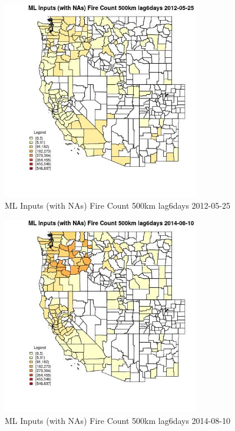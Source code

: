 \begin{figure} 
\centering  
\includegraphics[width=0.77\textwidth]{Code_Outputs/Report_ML_input_PM25_Step4_part_e_de_duplicated_aves_compiled_2019-05-18wNAs_CountyFire_Count_500km_lag6daysMean2012-05-25.jpg} 
\caption{\label{fig:Report_ML_input_PM25_Step4_part_e_de_duplicated_aves_compiled_2019-05-18wNAsCountyFire_Count_500km_lag6daysMean2012-05-25}ML Inputs (with NAs) Fire Count 500km lag6days 2012-05-25} 
\end{figure} 
 

\begin{figure} 
\centering  
\includegraphics[width=0.77\textwidth]{Code_Outputs/Report_ML_input_PM25_Step4_part_e_de_duplicated_aves_compiled_2019-05-18wNAs_CountyFire_Count_500km_lag6daysMean2014-08-10.jpg} 
\caption{\label{fig:Report_ML_input_PM25_Step4_part_e_de_duplicated_aves_compiled_2019-05-18wNAsCountyFire_Count_500km_lag6daysMean2014-08-10}ML Inputs (with NAs) Fire Count 500km lag6days 2014-08-10} 
\end{figure} 
 


